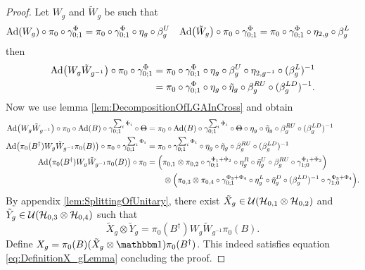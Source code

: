 \documentclass[11pt,a4paper,twoside]{article}
\numberwithin{equation}{section}
\begin{document}
	\begin{proof}
		Let $W_g$ and $\tilde W_g$ be such that
		\begin{align}
			\Ad{W_g}\circ\pi_0\circ\gamma^\Phi_{0;1}& =\pi_0\circ\gamma^\Phi_{0;1}\circ\eta_g\circ\beta_g^U
			&\Ad{\tilde W_g} \circ\pi_0\circ\gamma^\Phi_{0;1}& =\pi_0\circ\gamma^\Phi_{0;1}\circ\eta_{2,g}\circ\beta_g^L
		\end{align}
		then
		\begin{align}
			\Ad{W_g\tilde{W}_{g^{-1}}}\circ\pi_0\circ\gamma^\Phi_{0;1}&=\pi_0\circ\gamma^\Phi_{0;1}\circ\eta_g\circ\beta_g^U\circ\eta_{2,g^{-1}}\circ(\beta_g^L)^{-1}\\
			&=\pi_0\circ\gamma^\Phi_{0;1}\circ\eta_g\circ\tilde{\eta}_g\circ\beta_g^{RU}\circ(\beta_g^{LD})^{-1}.
		\end{align}
		Now we use lemma \ref{lem:DecompositionOfLGAInCross} and obtain
		\begin{align}
			\Ad{W_g\tilde{W}_{g^{-1}}}\circ\pi_0\circ\Ad{B}\circ\gamma^{\sum_i\Phi_i}_{0;1}\circ\stkout{\Theta}&=\pi_0\circ\Ad{B}\circ\gamma^{\sum_i\Phi_i}_{0;1}\circ\stkout{\Theta}\circ\eta_g\circ\tilde{\eta}_g\circ\beta_g^{RU}\circ(\beta_g^{LD})^{-1}\\
			\Ad{\pi_0(B^\dagger)W_g\tilde{W}_{g^{-1}}\pi_0(B)}\circ\pi_0\circ\gamma^{\sum_i\Phi_i}_{0;1}&=\pi_0\circ\gamma^{\sum_i\Phi_i}_{0;1}\circ\eta_g\circ\tilde{\eta}_g\circ\beta_g^{RU}\circ(\beta_g^{LD})^{-1}\\
			\Ad{\pi_0(B^\dagger)W_g\tilde{W}_{g^{-1}}\pi_0(B)}\circ\pi_0&=\left(\pi_{0,1}\otimes\pi_{0,2}\circ\gamma^{\Phi_1+\Phi_2}_{0;1}\circ\eta_g^R\circ\tilde{\eta}_g^U\circ\beta_g^{RU}\circ\gamma^{\Phi_1+\Phi_2}_{1;0}\right)\\
			\nonumber
			&\qquad\otimes \left(\pi_{0,3}\otimes\pi_{0,4}\circ\gamma^{\Phi_3+\Phi_4}_{0;1}\circ\eta_g^L\circ\tilde{\eta}_g^D\circ(\beta_g^{LD})^{-1}\circ\gamma^{\Phi_3+\Phi_4}_{1;0}\right).
		\end{align}
		By appendix \ref{lem:SplittingOfUnitary}, there exist $\tilde{X}_g\in\mathcal U(\mathcal H_{0,1}\otimes\mathcal H_{0,2})$ and $\tilde{Y}_g\in\mathcal U(\mathcal H_{0,3}\otimes\mathcal H_{0,4})$ such that
		\begin{equation}
			\tilde{X}_g\otimes\tilde{Y}_g=\pi_0(B^\dagger)W_g\tilde{W}_{g^{-1}}\pi_0(B).
		\end{equation}
		Define $X_g=\pi_0(B)(\tilde{X}_g\otimes\id)\pi_0(B^\dagger)$. This indeed satisfies equation \eqref{eq:DefinitionX_gLemma} concluding the proof.
	\end{proof}
\end{document}

